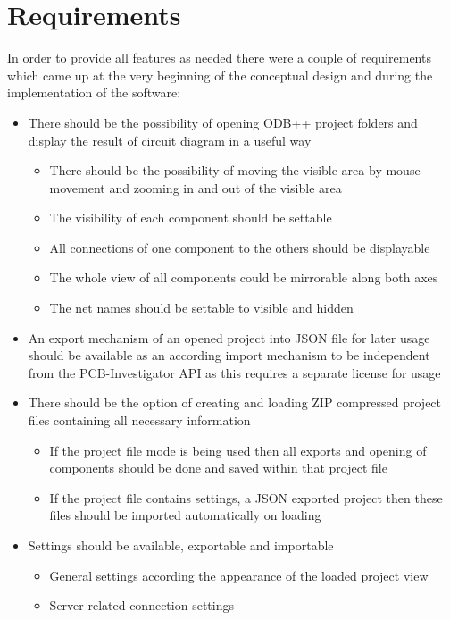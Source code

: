 	\section{Requirements}
In order to provide all features as needed there were a couple of requirements which came up at the very beginning of the conceptual design and during the implementation of the software:\newpage
\begin{itemize}
	\item There should be the possibility of opening \ac{ODB}++ project folders and display the result of circuit diagram in a useful way
	\begin{itemize}
		\item There should be the possibility of moving the visible area by mouse movement and zooming in and out of the visible area
		\item The visibility of each component should be settable
		\item All connections of one component to the others should be displayable
		\item The whole view of all components could be mirrorable along both axes
		\item The net names should be settable to visible and hidden
	\end{itemize}
	\item An export mechanism of an opened project into \ac{JSON} file for later usage should be available as an according import mechanism to be independent from the \ac{PCB}-Investigator  \ac{API} as this requires a separate license for usage
	\item There should be the option of creating and loading ZIP compressed project files containing all necessary information
	\begin{itemize}
		\item If the project file mode is being used then all exports and opening of components should be done and saved within that project file
		\item If the project file contains settings, a \ac{JSON} exported project then these files should be imported automatically on loading
	\end{itemize}
	\item Settings should be available, exportable and importable
	\begin{itemize}
		\item General settings according the appearance of the loaded project view
		\item Server related connection settings

\end{itemize}
\end{itemize}
